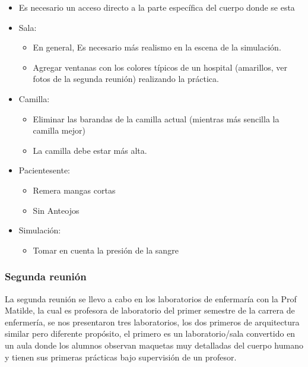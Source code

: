 \begin{itemize}
\itemsep1pt\parskip0pt
\item
  Es necesario un acceso directo a la parte específica del cuerpo donde
  se esta
\item
  Sala:

  \begin{itemize}
  \itemsep1pt\parskip0pt
  \item
    En general, Es necesario más realismo en la escena de la simulación.
  \item
    Agregar ventanas con los colores típicos de un hospital (amarillos,
    ver fotos de la segunda reunión) realizando la práctica.
  \end{itemize}
\item
  Camilla:

  \begin{itemize}
  \itemsep1pt\parskip0pt
  \item
    Eliminar las barandas de la camilla actual (mientras más sencilla la
    camilla mejor)
  \item
    La camilla debe estar más alta.
  \end{itemize}
\item
  Pacientesente:

  \begin{itemize}
  \itemsep1pt\parskip0pt
  \item
    Remera mangas cortas
  \item
    Sin Anteojos
  \end{itemize}
\item
  Simulación:

  \begin{itemize}
  \itemsep1pt\parskip0pt
  \item
    Tomar en cuenta la presión de la sangre
  \end{itemize}
\end{itemize}

\subsubsection{Segunda reunión}\label{segunda-reuniuxf3n}

La segunda reunión se llevo a cabo en los laboratorios de enfermaría con
la Prof Matilde, la cual es profesora de laboratorio del primer semestre
de la carrera de enfermería, se nos presentaron tres laboratorios, los
dos primeros de arquitectura similar pero diferente propósito, el
primero es un laboratorio/sala convertido en un aula donde los alumnos
observan maquetas muy detalladas del cuerpo humano y tienen sus primeras
prácticas bajo supervisión de un profesor.

